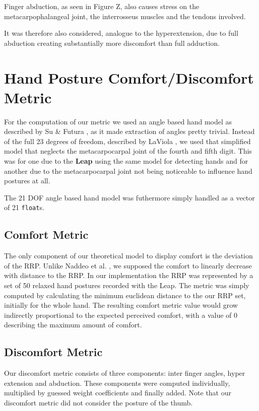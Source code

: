 \documentclass{sig-alternate-05-2015}
\begin{document}
Finger abduction, as seen in Figure Z,
also causes stress on the metacarpophalangeal joint, the interrosseus muscles and the tendons involved.

It was therefore also considered, analogue to the hyperextension, due to full abduction creating substantially more discomfort than full adduction.


\section{Hand Posture Comfort/Discomfort Metric}
For the computation of our metric we used an angle based hand model as described by Su \& Futura \cite{su1994logical}, as it made extraction of angles pretty trivial. Instead of the full 23 degrees of freedom, described by LaViola \cite{laviola1999survey}, we used that simplified model that neglects the metacarpocarpal joint of the fourth and fifth digit. This was for one due to the \textbf{Leap} using the same model for detecting hands and for another due to the metacarpocarpal joint not being noticeable to influence hand postures at all.

The 21 DOF angle based hand model was futhermore simply handled as a vector of 21 \texttt{float}s. 

\subsection{Comfort Metric}

The only component of our theoretical model to display comfort is the deviation of the RRP. Unlike Naddeo et al. \cite{naddeo2015proposal}, we supposed the comfort to linearly decrease with distance to the RRP.
 In our implementation the RRP was represented by a set of 50 relaxed hand postures recorded with the Leap. The metric was simply computed by calculating the minimum euclidean distance to the our RRP set, initially for the whole hand.
The resulting comfort metric value would grow indirectly proportional to the expected perceived comfort, with a value of 0 describing the maximum amount of comfort. 


\subsection{Discomfort Metric}

Our discomfort metric consists of three components: inter finger angles, hyper extension and abduction. These components were computed individually, multiplied by guessed weight coefficients and finally added. Note that our discomfort metric did not consider the posture of the thumb.
\end{document}
